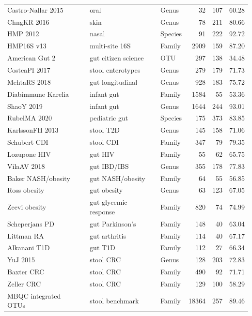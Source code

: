 \documentclass{jmlr}
\begin{document}
\begin{table}[htbp]
\begin{tabular}{>{\raggedright\arraybackslash}p{}>{\raggedright\arraybackslash}p{}>{\raggedright\arraybackslash}p{}rrr}
Castro-Nallar 2015~\cite{CastroNallar2015} & oral & Genus & 32 & 107 & 60.28 \\
ChngKR 2016~\cite{Chng2016} & skin & Genus & 78 & 211 & 80.66 \\
HMP 2012~\cite{HMP2012} & nasal & Species & 91 & 222 & 92.72 \\
HMP16S v13~\cite{HMP2012} & multi-site 16S & Family & 2909 & 159 & 87.20 \\
American Gut 2~\cite{McDonald2018} & gut citizen science & OTU & 297 & 138 & 34.48 \\
CosteaPI 2017~\cite{Costea2017} & stool enterotypes & Genus & 279 & 179 & 71.73 \\
MehtaRS 2018~\cite{Mehta2018} & gut longitudinal & Genus & 928 & 183 & 75.72 \\
Diabimmune Karelia~\cite{Vatanen2016} & infant gut & Family & 1584 & 55 & 53.36 \\
ShaoY 2019~\cite{Shao2019} & infant gut & Genus & 1644 & 244 & 93.01 \\
RubelMA 2020~\cite{Rubel2020} & pediatric gut & Species & 175 & 373 & 83.85 \\
KarlssonFH 2013~\cite{Karlsson2013} & stool T2D & Genus & 145 & 158 & 71.06 \\
Schubert CDI~\cite{Schubert2014} & stool CDI & Family & 347 & 79 & 79.35 \\
Lozupone HIV~\cite{Lozupone2013} & gut HIV & Family & 55 & 62 & 65.75 \\
VilaAV 2018~\cite{Vila2018} & gut IBD/IBS & Genus & 355 & 178 & 77.83 \\
Baker NASH/obesity~\cite{Zhu2013} & gut NASH/obesity & Family & 64 & 55 & 56.85 \\
Ross obesity~\cite{Ross2015} & gut obesity & Genus & 63 & 123 & 67.05 \\
Zeevi obesity~\cite{Zeevi2015} & gut glycemic response & Family & 820 & 74 & 74.99 \\
Scheperjans PD~\cite{Scheperjans2015} & gut Parkinson's & Family & 148 & 40 & 63.04 \\
Littman RA~\cite{Scher2013} & gut arthritis & Family & 114 & 40 & 67.17 \\
Alkanani T1D~\cite{Alkanani2015} & gut T1D & Family & 112 & 27 & 66.34 \\
YuJ 2015~\cite{Yu2015} & stool CRC & Genus & 128 & 203 & 72.83 \\
Baxter CRC~\cite{Baxter2016} & stool CRC & Family & 490 & 92 & 71.71 \\
Zeller CRC~\cite{Zeller2014} & stool CRC & Family & 129 & 100 & 58.29 \\
MBQC integrated OTUs~\cite{MBQC2017} & stool benchmark & Family & 18364 & 257 & 89.46 \\
\bottomrule
\end{tabular}
\end{table}
\end{document}
